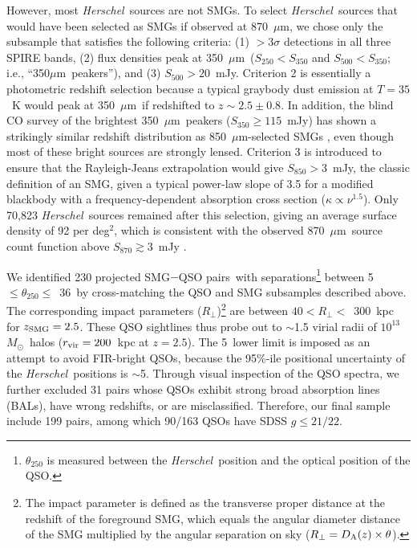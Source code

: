 \documentclass[iop,revtex4,twocolumn,apj,numberedappendix,appendixfloats]{emulateapj}
\newcommand{\hers}{{\it Herschel}}
\newcommand{\msun}{$M_{\odot}$}
\newcommand{\um}{$\mu$m}
\newcommand{\sqdeg}{deg$^2$}
\newcommand{\sqps}{SMG$-$QSO pairs}
\begin{document}
However, most \hers\ sources are not SMGs. To select \hers\ sources that would have been selected as SMGs if observed at 870~\um, we chose only the subsample that satisfies the following criteria: (1) $>$3$\sigma$ detections in all three SPIRE bands, (2) flux densities peak at 350~\um\ ($S_{250} < S_{350}$ and $S_{500} < S_{350}$; i.e., ``350\um\ peakers''), and (3) $S_{500} > 20$~mJy. Criterion 2 is essentially a photometric redshift selection because a typical graybody dust emission at $T = 35$~K would peak at 350~\um\ if redshifted to $z \sim 2.5\pm0.8$. In addition, the blind CO survey of the brightest 350~\um\ peakers ($S_{350} \geq 115$~mJy) has shown a strikingly similar redshift distribution as 850~\um-selected SMGs \citep{Harris12}, even though most of these bright sources are strongly lensed. Criterion 3 is introduced to ensure that the Rayleigh-Jeans extrapolation would give $S_{850} > 3$~mJy, the classic definition of an SMG, given a typical power-law slope of 3.5 for a modified blackbody with a frequency-dependent absorption cross section ($\kappa \propto \nu^{1.5}$). Only 70,823 \hers\ sources remained after this selection, giving an average surface density of 92 per \sqdeg, which is consistent with the observed 870~\um\ source count function above $S_{870} \gtrsim 3$~mJy \citep{Weis09,Coppin06}. %
 
We identified 230 projected \sqps\ with separations\footnote{$\theta_{250}$ is measured between the \hers\ position and the optical position of the QSO.} between 5\arcsec~$\leq \theta_{250} \leq$~36\arcsec\ by cross-matching the QSO and SMG subsamples described above. The corresponding impact parameters ($R_\bot$)\footnote{The impact parameter is defined as the transverse proper distance at the redshift of the foreground SMG, which equals the angular diameter distance of the SMG multiplied by the angular separation on sky ($R_\bot = D_{\rm A}(z) \times \theta$).} are between $40 < R_\bot <$~300~kpc for $z_{\rm SMG} = 2.5$. These QSO sightlines thus probe out to $\sim$1.5 virial radii of $10^{13}$~\msun\ halos ($r_{\rm vir} = 200$~kpc at $z = 2.5$). The 5\arcsec\ lower limit is imposed as an attempt to avoid FIR-bright QSOs, because the 95\%-ile positional uncertainty of the \hers\ positions is $\sim$5\arcsec. Through visual inspection of the QSO spectra, we further excluded 31 pairs whose QSOs exhibit strong broad absorption lines (BALs),
have wrong redshifts, or are misclassified. Therefore, our final sample include 199 pairs, among which 90/163 QSOs have SDSS $g \leq 21/22$.
\end{document}
